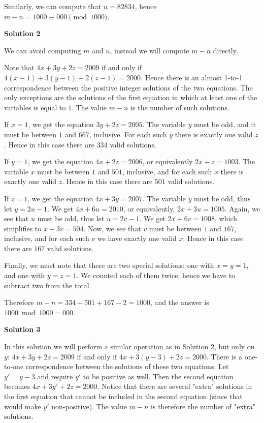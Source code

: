 \begin{enumerate}
 Similarly, we can compute that $n=82834$, hence $m-n = 1000 \equiv \boxed{000} \pmod{1000}$.

 



\textbf{Solution 2}

We can avoid computing $m$ and $n$, instead we will compute $m-n$ directly.

 Note that $4x+3y+2z=2009$ if and only if $4(x-1)+3(y-1)+2(z-1)=2000$. Hence there is an almost 1-to-1 correspondence between the positive integer solutions of the two equations. The only exceptions are the solutions of the first equation in which at least one of the variables is equal to $1$. The value $m-n$ is the number of such solutions.

 If $x=1$, we get the equation $3y+2z=2005$. The variable $y$ must be odd, and it must be between $1$ and $667$, inclusive. For each such $y$ there is exactly one valid $z$. Hence in this case there are $334$ valid solutions.

 If $y=1$, we get the equation $4x+2z=2006$, or equivalently $2x+z=1003$. The variable $x$ must be between $1$ and $501$, inclusive, and for each such $x$ there is exactly one valid $z$. Hence in this case there are $501$ valid solutions.

 If $z=1$, we get the equation $4x+3y=2007$. The variable $y$ must be odd, thus let $y=2u-1$. We get $4x+6u=2010$, or equivalently, $2x+3u=1005$. Again, we see that $u$ must be odd, thus let $u=2v-1$. We get $2x+6v=1008$, which simplifies to $x+3v=504$. Now, we see that $v$ must be between $1$ and $167$, inclusive, and for each such $v$ we have exactly one valid $x$. Hence in this case there are $167$ valid solutions.

 Finally, we must note that there are two special solutions: one with $x=y=1$, and one with $y=z=1$. We counted each of them twice, hence we have to subtract two from the total.

 Therefore $m-n = 334 + 501 + 167 - 2 = 1000$, and the answer is $1000\bmod 1000 = \boxed{000}$.

 



\textbf{Solution 3}

In this solution we will perform a similar operation as in Solution 2, but only on $y$: $4x+3y+2z=2009$ if and only if $4x+3(y-3)+2z=2000$. There is a one-to-one correspondence between the solutions of these two equations. Let $y'=y-3$ and require $y'$ to be positive as well. Then the second equation becomes $4x+3y'+2z=2000$. Notice that there are several "extra" solutions in the first equation that cannot be included in the second equation (since that would make $y'$ non-positive). The value $m-n$ is therefore the number of "extra" solutions.


\end{enumerate}
